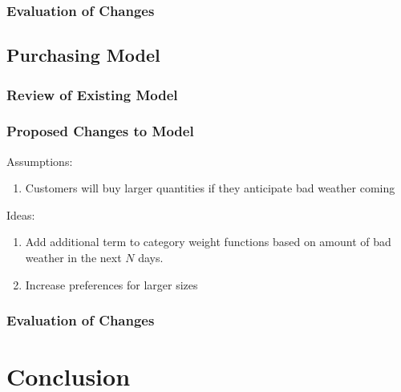 \documentclass[11pt, letterpaper]{article}
\begin{document}
\subsubsection{Evaluation of Changes}

\subsection{Purchasing Model}

\subsubsection{Review of Existing Model}

\subsubsection{Proposed Changes to Model}

Assumptions:
\begin{enumerate}
\item Customers will buy larger quantities if they anticipate bad weather coming
\end{enumerate}

Ideas:
\begin{enumerate}
\item Add additional term to category weight functions based on amount of bad weather in the next $N$ days.
\item Increase preferences for larger sizes
\end{enumerate}

\subsubsection{Evaluation of Changes}

\section{Conclusion}


%
%
\end{document}
